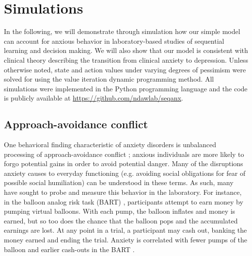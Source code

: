 \documentclass[11pt]{article} %
\begin{document}
\section{Simulations}

In the following, we will demonstrate through simulation how our simple model can account for anxious behavior in laboratory-based studies of sequential learning and decision making. We will also show that our model is consistent with clinical theory describing the transition from clinical anxiety to depression. Unless otherwise noted, state and action values under varying degrees of pessimism were solved for using the value iteration dynamic programming method\citep{SuttonBarto2018}. All simulations were implemented in the Python programming language and the code is publicly available at \url{https://github.com/ndawlab/seqanx}. 

\subsection{Approach-avoidance conflict}

One behavioral finding characteristic of anxiety disorders is unbalanced processing of approach-avoidance conflict \citep{aupperle2010}; anxious individuals are more likely to forgo potential gains in order to avoid potential danger. Many of the disruptions anxiety causes to everyday functioning (e.g. avoiding social obligations for fear of possible social humiliation) can be understood in these terms. As such, many have sought to probe and measure this behavior in the laboratory. For instance, in the balloon analog risk task (BART) \citep{Lejuez2002}, participants attempt to earn money by pumping virtual balloons. With each pump, the balloon inflates and money is earned, but so too does the chance that the balloon pops and the accumulated earnings are lost. At any point in a trial, a participant may cash out, banking the money earned and ending the trial. Anxiety is correlated with fewer pumps of the balloon and earlier cash-outs in the BART \citep{Maner2007, ramirez2015}.
\end{document}
